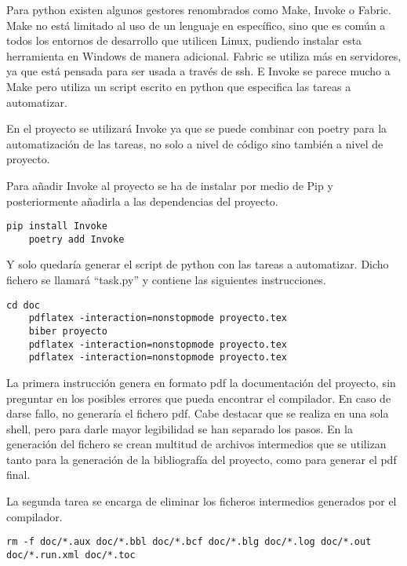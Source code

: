 Para \gls{python} existen algunos gestores renombrados como Make, Invoke o Fabric. Make no está limitado al uso de un lenguaje en específico, sino que es común a todos los entornos de desarrollo que utilicen Linux, pudiendo instalar esta herramienta en Windows de manera adicional. Fabric se utiliza más en servidores, ya que está pensada para ser usada a través de \gls{ssh}. E Invoke se parece mucho a Make pero utiliza un \gls{script} escrito en \gls{python} que especifica las tareas a automatizar. 

En el proyecto se utilizará Invoke ya que se puede combinar con \Gls{poetry} para la automatización de las tareas, no solo a nivel de código sino también a nivel de proyecto.

Para añadir Invoke al proyecto se ha de instalar por medio de Pip y posteriormente añadirla a las \glspl{dependencia} del proyecto.
\begin{lstlisting}[style=consola]
	pip install Invoke
	poetry add Invoke
\end{lstlisting}

Y solo quedaría generar el \gls{script} de python con las tareas a automatizar. Dicho fichero se llamará ``task.py'' y contiene las siguientes instrucciones. 

\begin{lstlisting}[style=consola]
	cd doc
	pdflatex -interaction=nonstopmode proyecto.tex
	biber proyecto
	pdflatex -interaction=nonstopmode proyecto.tex
	pdflatex -interaction=nonstopmode proyecto.tex
\end{lstlisting}
La primera instrucción genera en formato pdf la documentación del proyecto, sin preguntar en los posibles errores que pueda encontrar el compilador. En caso de darse fallo, no generaría el fichero pdf. Cabe destacar que se realiza en una sola \gls{shell}, pero para darle mayor legibilidad se han separado los pasos. En la generación del fichero se crean multitud de archivos intermedios que se utilizan tanto para la generación de la bibliografía del proyecto, como para generar el pdf final. 

La segunda tarea se encarga de eliminar los ficheros intermedios generados por el compilador.
\begin{lstlisting}[style=consola]
	rm -f doc/*.aux doc/*.bbl doc/*.bcf doc/*.blg doc/*.log doc/*.out doc/*.run.xml doc/*.toc
\end{lstlisting}

